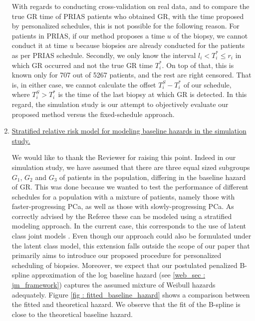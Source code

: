 \begin{enumerate}
    With regards to conducting cross-validation on real data, and to compare the true GR time of PRIAS patients who obtained GR, with the time proposed by personalized schedules, this is not possible for the following reason. For patients in PRIAS, if our method proposes a time $u$ of the biopsy, we cannot conduct it at time $u$ because biopsies are already conducted for the patients as per PRIAS schedule. Secondly, we only know the interval $l_i < T^*_i \leq r_i$ in which GR occurred and not the true GR time $T^*_i$. On top of that, this is known only for 707 out of 5267 patients, and the rest are right censored. That is, in either case, we cannot calculate the offset $T^S_i - T^*_i$ of our schedule, where $T^S_i > T^*_i$ is the time of the last biopsy at which GR is detected. In this regard, the simulation study is our attempt to objectively evaluate our proposed method versus the fixed-schedule approach.

    \item \underline{Stratified relative risk model for modeling baseline hazards in the simulation study.}

    We would like to thank the Reviewer for raising this point. Indeed in our simulation study, we have assumed that there are three equal sized subgroups $G_1$, $G_2$ and $G_3$ of patients in the population, differing in the baseline hazard of GR. This was done because we wanted to test the performance of different schedules for a population with a mixture of patients, namely those with faster-progressing PCa, as well as those with slowly-progressing PCa. As correctly advised by the Referee these can be modeled using a stratified modeling approach. In the current case, this corresponds to the use of latent class joint models \citep{proust2014joint}. Even though our approach could also be formulated under the latent class model, this extension falls outside the scope of our paper that primarily aims to introduce our proposed procedure for personalized scheduling of biopsies. Moreover, we expect that our postulated penalized B-spline approximation of the log baseline hazard (see \ref{web_sec : jm_framework}) captures the assumed mixture of Weibull hazards adequately. Figure \ref{fig : fitted_baseline_hazard} shows a comparison between the fitted and theoretical hazard. We observe that the fit of the B-spline is close to the theoretical baseline hazard.


\end{enumerate}
